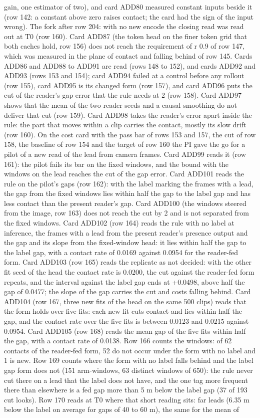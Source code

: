 \documentclass[10pt,twocolumn]{article}
\theoremstyle{remark}
\newcommand{\tier}[1]{\textsc{\small #1}}
\begin{document}
gain, one estimator of two), and card ADD80 measured constant inputs beside it (row 142: a constant above zero raises contact; the card had the sign of the input wrong). The fork after row 204: with no new encode the closing read was read out at \tier{T0} (row 160). Card ADD87 (the token head on the finer token grid that both caches hold, row 156) does not reach the requirement of r 0.9 of row 147, which was measured in the plane of contact and falling behind of row 145. Cards ADD86 and ADD88 to ADD91 are read (rows 148 to 152), and cards ADD92 and ADD93 (rows 153 and 154); card ADD94 failed at a control before any rollout (row 155), card ADD95 is its changed form (row 157), and card ADD96 puts the cut of the reader's gap error that the rule needs at 2 (row 158). Card ADD97 shows that the mean of the two reader seeds and a causal smoothing do not deliver that cut (row 159). Card ADD98 takes the reader's error apart inside the rule: the part that moves within a clip carries the contact, mostly its slow drift (row 160). On the cost card with the pass bar of rows 153 and 157, the cut of row 158, the baseline of row 154 and the target of row 160 the PI gave the go for a pilot of a new read of the lead from camera frames. Card ADD99 reads it (row 161): the pilot fails its bar on the fixed windows, and the bound with the windows on the lead reaches the cut of the gap error. Card ADD101 reads the rule on the pilot's gaps (row 162): with the label marking the frames with a lead, the gap from the fixed windows lies within half the gap to the label gap and has less contact than the present reader's gap. Card ADD100 (the windows steered from the image, row 163) does not reach the cut by 2 and is not separated from the fixed windows. Card ADD102 (row 164) reads the rule with no label at inference, the frames with a lead from the present reader's presence output and the gap and its slope from the fixed-window head: it lies within half the gap to the label gap, with a contact rate of 0.0169 against 0.0954 for the reader-fed form. Card ADD103 (row 165) reads the replicate as not decided: with the other fit seed of the head the contact rate is 0.0200, the cut against the reader-fed form repeats, and the interval against the label gap ends at +0.0498, above half the gap of 0.0477; the slope of the gap carries the cut and costs falling behind. Card ADD104 (row 167, three new fits of the head on the same 500 clips) reads that the form holds over five fits: each new fit cuts contact and lies within half the gap, and the contact rate over the five fits is between 0.0123 and 0.0215 against 0.0954. Card ADD105 (row 168) reads the mean gap of the five fits within half the gap, with a contact rate of 0.0138. Row 166 counts the windows: of 62 contacts of the reader-fed form, 52 do not occur under the form with no label and 1 is new. Row 169 counts where the form with no label falls behind and the label gap form does not (151 arm-windows, 63 distinct windows of 650): the rule never cut there on a lead that the label does not have, and the one tag more frequent there than elsewhere is a fed gap more than 5 m below the label gap (37 of 193 cut looks). Row 170 reads at \tier{T0} where that short reading sits: far leads (6.35 m below the label on average for gaps of 40 to 60 m), the same for the mean of 
\end{document}
